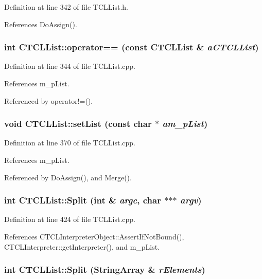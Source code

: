 Definition at line 342 of file TCLList.h.

References Do\-Assign().
\subsubsection{\setlength{\rightskip}{0pt plus 5cm}int CTCLList::operator== (const CTCLList \& {\em a\-CTCLList})}\label{classCTCLList_a6}




Definition at line 344 of file TCLList.cpp.

References m\_\-p\-List.

Referenced by operator!=().
\subsubsection{\setlength{\rightskip}{0pt plus 5cm}void CTCLList::set\-List (const char $\ast$ {\em am\_\-p\-List})\hspace{0.3cm}{\tt  [protected]}}\label{classCTCLList_b0}




Definition at line 370 of file TCLList.cpp.

References m\_\-p\-List.

Referenced by Do\-Assign(), and Merge().
\subsubsection{\setlength{\rightskip}{0pt plus 5cm}int CTCLList::Split (int \& {\em argc}, char $\ast$$\ast$$\ast$ {\em argv})}\label{classCTCLList_a10}




Definition at line 424 of file TCLList.cpp.

References CTCLInterpreter\-Object::Assert\-If\-Not\-Bound(), CTCLInterpreter::get\-Interpreter(), and m\_\-p\-List.
\subsubsection{\setlength{\rightskip}{0pt plus 5cm}int CTCLList::Split ({\bf String\-Array} \& {\em r\-Elements})}\label{classCTCLList_a9}




